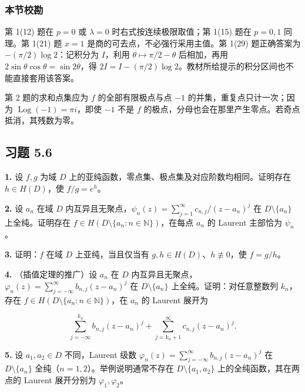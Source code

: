 \documentclass[11pt,a4paper]{article}
\begin{document}
\subsubsection{本节校勘}\label{ch05-practice-ux672cux8282ux6821ux52d8-3}

第 1(12) 题在 \(p=0\) 或 \(\lambda=0\) 时右式按连续极限取值；第 1(15)
题在 \(p=0,1\) 同理。第 1(21) 题 \(x=1\)
是商的可去点，不必强行采用主值。第 1(29) 题正确答案为
\(-(\pi/2)\log2\)：记积分为 \(I\)，利用 \(\theta\mapsto\pi/2-\theta\)
后相加，再用 \(2\sin\theta\cos\theta=\sin2\theta\)，得
\(2I=I-(\pi/2)\log2\)。教材所给提示的积分区间也不能直接套用该答案。

第 2 题的求和点集应为 \(f\) 的全部有限极点与点 \(-1\)
的并集，重复点只计一次；因为 \(\operatorname{Log}(-1)=\pi i\)，即使
\(-1\) 不是 \(f\)
的极点，分母也会在那里产生零点。若奇点抵消，其残数为零。

\subsection{习题 5.6}\label{ch05-practice-heading-6}

\par{}
\noindent\textbf{1.} 设 \(f,g\) 为域 \(D\)
上的亚纯函数，零点集、极点集及对应阶数均相同。证明存在 \(h\in H(D)\)，使
\(f/g=e^h\)。

\par{}
\noindent\textbf{2.} 设 \(a_n\) 在域 \(D\)
内互异且无聚点，\(\psi_n(z)=\sum_{j=1}^\infty c_{n,j}/(z-a_n)^j\) 在
\(D\setminus\{a_n\}\) 上全纯。证明存在
\(f\in H(D\setminus\{a_n:n\in\mathbb N\})\)，在每点 \(a_n\) 的 Laurent
主部恰为 \(\psi_n\)。

\par{}
\noindent\textbf{3.} 证明：\(f\) 在域 \(D\) 上亚纯，当且仅当有
\(g,h\in H(D)\)、\(h\not\equiv0\)，使 \(f=g/h\)。

\par{}
\noindent\textbf{4.} （插值定理的推广）设 \(a_n\) 在 \(D\)
内互异且无聚点，\(\varphi_n(z)=\sum_{j=-\infty}^\infty b_{n,j}(z-a_n)^j\)
在 \(D\setminus\{a_n\}\) 上全纯。证明：对任意整数列 \(k_n\)，存在
\(f\in H(D\setminus\{a_n:n\in\mathbb N\})\)，在 \(a_n\) 的 Laurent
展开为

\[
\sum_{j=-\infty}^{k_n}b_{n,j}(z-a_n)^j+\sum_{j=k_n+1}^\infty c_{n,j}(z-a_n)^j.
\]

\par{}
\noindent\textbf{5.} 设 \(a_1,a_2\in D\) 不同，Laurent 级数
\(\varphi_n(z)=\sum_{j=-\infty}^\infty b_{n,j}(z-a_n)^j\) 在
\(D\setminus\{a_n\}\) 全纯（\(n=1,2\)）。举例说明通常不存在
\(D\setminus\{a_1,a_2\}\) 上的全纯函数，其在两点的 Laurent 展开分别为
\(\varphi_1,\varphi_2\)。
\end{document}

